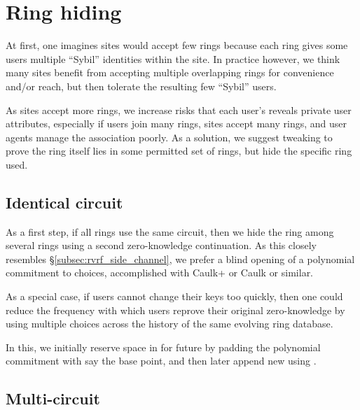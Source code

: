 \section{Ring hiding}%
\label{sec:ring_hiding}

At first, one imagines sites would accept few rings because each ring
gives some users multiple ``Sybil'' identities within the site.
In practice however, we think many sites benefit from accepting
multiple overlapping rings for convenience and/or reach, but then
tolerate the resulting few ``Sybil'' users.

As sites accept more rings, we increase risks that each user's \ring
reveals private user attributes, especially if
 users join many rings, sites accept many rings, and
 user agents manage the association poorly.
As a solution, we suggest tweaking \pifast to prove the ring itself
lies in some permitted set of rings, but hide the specific ring used.



\subsection{Identical circuit}

As a first step, if all rings use the same circuit, then we hide the
ring among several rings using a second zero-knowledge continuation.
As this closely resembles \S\ref{subsec:rvrf_side_channel}, we prefer
a blind opening of a polynomial commitment \cite{KZG} to \comring choices,
accomplished with Caulk+ \cite{caulk+} or Caulk \cite{caulk} or similar.

As a special case, if users cannot change their keys too quickly, then
one could reduce the frequency with which users reprove their original
zero-knowledge by using multiple \comring choices across the history
of the same evolving ring database.

In this, we initially reserve space in for future \comring by padding
the polynomial commitment with say the base point, and then later
append new \comring using \cite{aSVC}.


\subsection{Multi-circuit}

